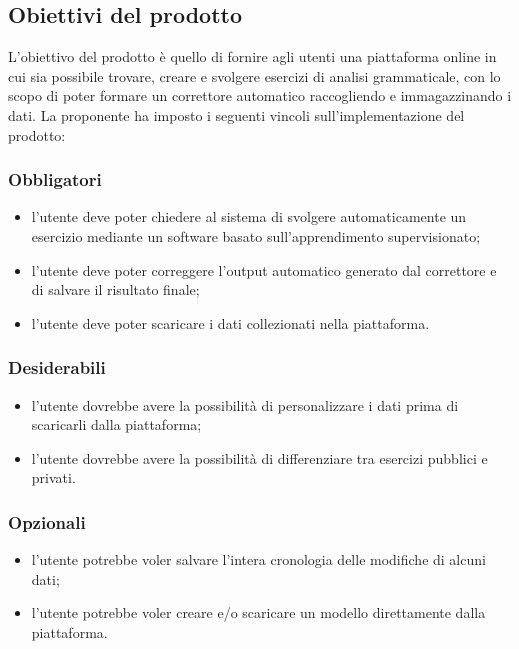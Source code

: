 \subsection{Obiettivi del prodotto}
	L'obiettivo del prodotto è quello di fornire agli utenti una piattaforma online in cui sia possibile trovare, creare e svolgere esercizi di analisi grammaticale, con lo scopo di poter formare un correttore automatico raccogliendo e immagazzinando i dati. 
La proponente ha imposto i seguenti vincoli sull'implementazione del prodotto:

\subsubsection{Obbligatori}
\begin{itemize}
	\item l'utente deve poter chiedere al sistema di svolgere automaticamente un esercizio mediante un software basato sull'apprendimento supervisionato;
	\item l'utente deve poter correggere l'output automatico generato dal correttore e di salvare il risultato finale;
	\item l'utente deve poter scaricare i dati collezionati nella piattaforma.
\end{itemize}
\subsubsection{Desiderabili}
\begin{itemize}
	\item l'utente dovrebbe avere la possibilità di personalizzare i dati prima di scaricarli dalla piattaforma;
	\item l'utente dovrebbe avere la possibilità di differenziare tra esercizi pubblici e privati.
\end{itemize}
\subsubsection{Opzionali}
\begin{itemize}
	\item l'utente potrebbe voler salvare l'intera cronologia delle modifiche di alcuni dati;
	\item l'utente potrebbe voler creare e/o scaricare un modello direttamente dalla piattaforma.
\end{itemize}

